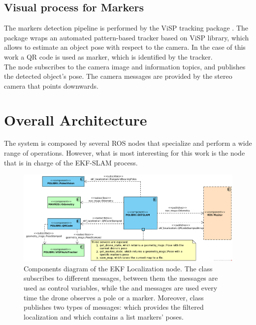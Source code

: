 \subsection{Visual process for Markers}
The markers detection pipeline is performed by the \ac{ViSP} tracking package \cite{visp-paper}. The package wraps an automated pattern-based tracker based on \ac{ViSP} library, which allows to estimate an object pose with respect to the camera. In the case of this work a QR code is used as marker, which is identified by the tracker. \\

The  node subscribes to the camera image and information topics, and publishes the detected object's pose. The camera messages are provided by the stereo camera that points downwards.

\section{Overall Architecture}
\label{sec:chapter2:arch}
The system is composed by several \ac{ROS} nodes that specialize and perform a wide range of operations. However, what is most interesting for this work is the node that is in charge of the EKF-SLAM process. \\

\begin{figure}
    \centering
    \includegraphics[width=\textwidth]{Images/fig9-components_diagram}
    \caption[Components diagram of the EKF Localization node]{Components diagram of the \ac{EKF} Localization node. The  class subscribes to different messages, between them the  messages are used as control variables, while the  and  messages are used every time the drone observes a pole or a marker. Moreover,  class publishes two types of messages:  which provides the filtered localization and  which contains a list markers' poses.}
    \label{fig:chapter2:architecture:components}
\end{figure}

